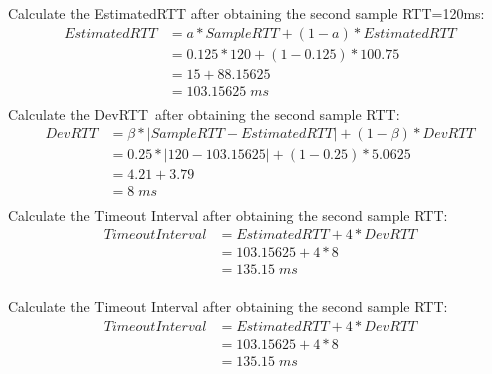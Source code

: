 \documentclass[12pt,a4paper]{article}
\begin{document}
Calculate the EstimatedRTT after obtaining the second sample RTT=120ms:
\begin{equation*}
    \begin{split}
        EstimatedRTT &= a * SampleRTT+(1- a) * EstimatedRTT \\
                     &= 0.125 * 120 + (1-0.125) * 100.75 \\
                     &= 15 + 88.15625\\
                     &= 103.15625 \; ms \\
    \end{split}
\end{equation*}
Calculate the DevRTT after obtaining the second sample RTT:
\begin{equation*}
    \begin{split}
        DevRTT &= \beta * | SampleRTT- EstimatedRTT|+(1- \beta )* DevRTT \\
                     &= 0.25 * |120-103.15625| + (1-0.25) *5.0625 \\
                     &= 4.21 + 3.79 \\
                     &= 8 \; ms \\
    \end{split}
\end{equation*}
Calculate the Timeout Interval after obtaining the second sample RTT:
\begin{equation*}
    \begin{split}
        TimeoutInterval &= EstimatedRTT +4* DevRTT \\
                     &= 103.15625 + 4 *8\\
                     &= 135.15 \; ms\\
    \end{split}
\end{equation*}

Calculate the Timeout Interval after obtaining the second sample RTT:
\begin{equation*}
    \begin{split}
        TimeoutInterval &= EstimatedRTT +4* DevRTT \\
                     &= 103.15625 + 4 *8\\
                     &= 135.15 \; ms\\
    \end{split}
\end{equation*}
\end{document}

